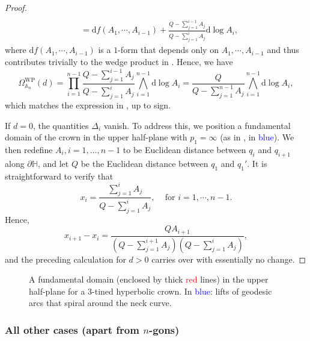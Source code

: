\documentclass{amsart}
\newcommand{\HH}{\mathbb{H}}
\theoremstyle{definition}
\begin{document}
\begin{proof}
\begin{align*}
\\ & = \mathrm{d}f(A_1,\cdots,A_{i-1})+ \frac{Q-\sum_{j=1}^{i-1} A_j}{Q-\sum_{j=1}^{i} A_j}\mathrm{d}\log A_i,
\end{align*}
where $\mathrm{d}f(A_1,\cdots,A_{i-1})$ is a $1$-form that depends only on $A_1,\cdots,A_{i-1}$ and thus contributes trivially to the wedge product in . Hence, we have
\[
\Omega^{\mathrm{WP}}_{\mathbb{A}_n}(d) = \prod_{i=1}^{n-1} \frac{Q-\sum_{j=1}^{i-1} A_j}{Q-\sum_{j=1}^{i} A_j} \bigwedge_{i=1}^{n-1} \mathrm{d}\log A_i  = \frac{Q}{Q-\sum_{j=1}^{n-1} A_j}\bigwedge_{i=1}^{n-1} \mathrm{d}\log A_i,
\]
which matches the expression in , up to sign.\medskip

If $d=0$, the quantities $\Delta_i$ vanish. To address this, we position a fundamental domain of the crown in the upper half-plane with $p_1 = \infty$ (as in , in \textcolor{blue}{blue}). We then redefine $A_i, i=1,\dotsc,n-1$ to be Euclidean distance between $q_i$ and $q_{i+1}$ along $\partial\HH$, and let $Q$ be the Euclidean distance between $q_1$ and $q_1'.$ It is straightforward to verify that 
\[
x_i = \frac{\sum_{j=1}^i A_j}{Q-\sum_{j=1}^i A_j}, \,\quad \text{for }i = 1, \cdots, n-1.
\]
Hence,
\[
x_{i+1}-x_i = \frac{QA_{i+1}}{(Q-\sum_{j=1}^{i+1} A_j)(Q-\sum_{j=1}^{i} A_j)},
\]
and the preceding calculation for $d>0$ carries over with essentially no change.
\end{proof}

\begin{figure}[H]
    \centering
    
    \caption{A fundamental domain (enclosed by thick \textcolor{red}{red} lines) in the upper half-plane for a $3$-tined hyperbolic crown. In \textcolor{blue}{blue}: lifts of geodesic arcs that spiral around the neck curve.}
    \label{fig:crown-upper-half-plane}
\end{figure}







\subsubsection{All other cases (apart from $n$-gons)}
\end{document}
